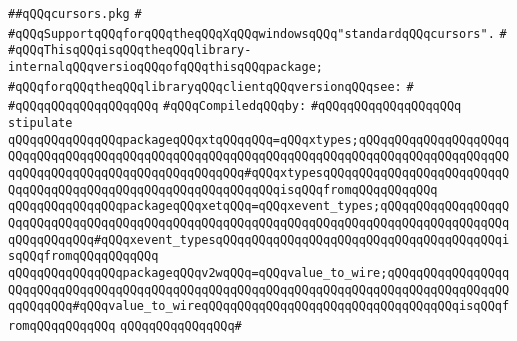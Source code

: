 \label{src/lib/x-kit/xclient/src/window/cursors.pkg}
\verb|##qQQqcursors.pkg|\newline
\verb|#|\newline
\verb|#qQQqSupportqQQqforqQQqtheqQQqXqQQqwindowsqQQq"standardqQQqcursors".|\newline
\verb|#|\newline
\verb|#qQQqThisqQQqisqQQqtheqQQqlibrary-internalqQQqversioqQQqofqQQqthisqQQqpackage;|\newline
\verb|#qQQqforqQQqtheqQQqlibraryqQQqclientqQQqversionqQQqsee:|\newline
\verb|#|\newline
\verb|#qQQqqQQqqQQqqQQqqQQq|\newline
\newline
\verb|#qQQqCompiledqQQqby:|\newline
\verb|#qQQqqQQqqQQqqQQqqQQq|\newline
\newline
\newline
\verb|stipulate|\newline
\verb|qQQqqQQqqQQqqQQqpackageqQQqxtqQQqqQQq=qQQqxtypes;qQQqqQQqqQQqqQQqqQQqqQQqqQQqqQQqqQQqqQQqqQQqqQQqqQQqqQQqqQQqqQQqqQQqqQQqqQQqqQQqqQQqqQQqqQQqqQQqqQQqqQQqqQQqqQQqqQQqqQQqqQQq#qQQqxtypesqQQqqQQqqQQqqQQqqQQqqQQqqQQqqQQqqQQqqQQqqQQqqQQqqQQqqQQqqQQqqQQqisqQQqfromqQQqqQQqqQQq|\newline
\verb|qQQqqQQqqQQqqQQqpackageqQQqxetqQQq=qQQqxevent_types;qQQqqQQqqQQqqQQqqQQqqQQqqQQqqQQqqQQqqQQqqQQqqQQqqQQqqQQqqQQqqQQqqQQqqQQqqQQqqQQqqQQqqQQqqQQqqQQqqQQq#qQQqxevent_typesqQQqqQQqqQQqqQQqqQQqqQQqqQQqqQQqqQQqqQQqisqQQqfromqQQqqQQqqQQq|\newline
\verb|qQQqqQQqqQQqqQQqpackageqQQqv2wqQQq=qQQqvalue_to_wire;qQQqqQQqqQQqqQQqqQQqqQQqqQQqqQQqqQQqqQQqqQQqqQQqqQQqqQQqqQQqqQQqqQQqqQQqqQQqqQQqqQQqqQQqqQQqqQQq#qQQqvalue_to_wireqQQqqQQqqQQqqQQqqQQqqQQqqQQqqQQqqQQqisqQQqfromqQQqqQQqqQQq|\newline
\verb|qQQqqQQqqQQqqQQq#|\newline
